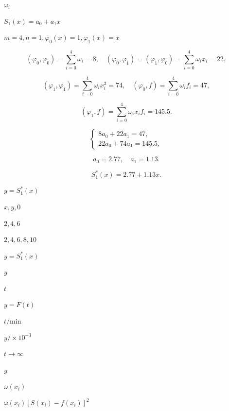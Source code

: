 \documentclass[UTF8,fontset=fandol,a4paper]{ctexart}
\begin{document}
\noindent $\omega_i$\par

\noindent $S_1(x)=a_0+a_1x$\par

\noindent $m=4,n=1,\varphi_0(x)=1,\varphi_1(x)=x$\par

\[
(\varphi_0,\varphi_0)=\sum_{i=0}^4\omega_i=8,\quad(\varphi_0,\varphi_1)=(\varphi_1,\varphi_0)=\sum_{i=0}^4\omega_ix_i=22,
\]

\[
(\varphi_1,\varphi_1)=\sum_{i=0}^4\omega_ix_i^2=74,\quad(\varphi_0,f)=\sum_{i=0}^4\omega_if_i=47,
\]

\[
(\varphi_1,f)=\sum_{i=0}^4\omega_ix_if_i=145.5.
\]

\[
\begin{cases}
8a_0+22a_1=47,\\
22a_0+74a_1=145.5,
\end{cases}
\]

\[
a_0=2.77,\quad a_1=1.13.
\]

\[
S_1^*(x)=2.77+1.13x.
\]

\noindent $y=S_1^*(x)$\par

\noindent $x,y,0$\par

\noindent $2,4,6$\par

\noindent $2,4,6,8,10$\par

\noindent $y=S_1^*(x)$\par

\noindent $y$\par

\noindent $t$\par

\noindent $y=F(t)$\par

\noindent $t/\mathrm{min}$\par

\noindent $y/\times10^{-3}$\par

\noindent $t\to\infty$\par

\noindent $y$\par

\noindent $\omega(x_i)$\par

\noindent $\omega(x_i)[S(x_i)-f(x_i)]^2$\par
\end{document}
